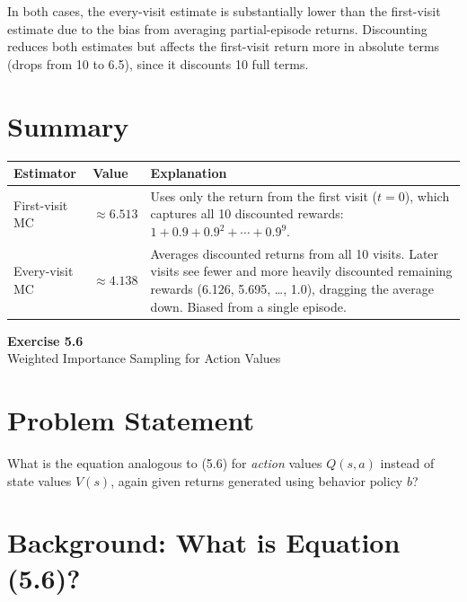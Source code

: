 \documentclass[11pt]{article}
\begin{document}
In both cases, the every-visit estimate is substantially lower than the first-visit estimate due to the bias from averaging partial-episode returns. Discounting reduces both estimates but affects the first-visit return more in absolute terms (drops from 10 to 6.5), since it discounts 10 full terms.

\section*{Summary}

\begin{table}[ht]
    \centering
    \begin{tabular}{p{} p{} p{}}
        \toprule
        \textbf{Estimator} & \textbf{Value} & \textbf{Explanation} \\
        \midrule
        First-visit MC & $\approx 6.513$ & Uses only the return from the first visit ($t=0$), which captures all 10 discounted rewards: $1 + 0.9 + 0.9^2 + \cdots + 0.9^9$. \\
        \addlinespace
        Every-visit MC & $\approx 4.138$ & Averages discounted returns from all 10 visits. Later visits see fewer and more heavily discounted remaining rewards (6.126, 5.695, \ldots, 1.0), dragging the average down. Biased from a single episode. \\
        \bottomrule
    \end{tabular}
\end{table}

\newpage

\begin{center}
    {\Large\color{garnet}\textbf{Exercise 5.6}}\\[6pt]
    {\large Weighted Importance Sampling for Action Values}
\end{center}

\section*{Problem Statement}

What is the equation analogous to (5.6) for \textit{action} values $Q(s, a)$ instead of state values $V(s)$, again given returns generated using behavior policy $b$?

\section*{Background: What is Equation (5.6)?}
\end{document}
